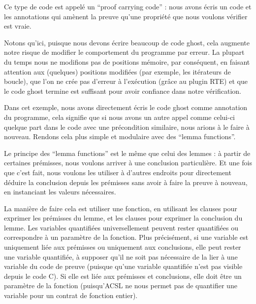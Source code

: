 



Ce type de code est appelé un ``proof carrying code'' : nous avons écris un code
et les annotations qui amènent la preuve qu'une propriété que nous voulons vérifier
est vraie.


Notons qu'ici, puisque nous devons écrire beaucoup de code ghost, cela augmente
notre risque de modifier le comportement du programme par erreur. La plupart du
temps nous ne modifions pas de positions mémoire, par conséquent, en faisant
attention aux (quelques) positions modifiées (par exemple, les itérateurs de
boucle), que l'on ne crée pas d'erreur à l'exécution (grâce au plugin RTE) et
que le code ghost termine est suffisant pour avoir confiance dans notre
vérification.


Dans cet exemple, nous avons directement écris le code ghost comme annotation du
programme, cela signifie que si nous avons un autre appel comme celui-ci quelque
part dans le code avec une précondition similaire, nous arions à le faire à
nouveau. Rendons cela plus simple et modulaire avec des ``lemma functions''.





Le principe des ``lemma functions'' est le même que celui des lemmes : à
partir de certaines prémisses, nous voulons arriver à une conclusion particulière.
Et une fois que c'est fait, nous voulons les utiliser à d'autres endroits pour 
directement déduire la conclusion depuis les prémisses sans avoir à faire la
preuve à nouveau, en instanciant les valeurs nécessaires.


La manière de faire cela est utiliser une fonction, en utilisant les clauses
 pour exprimer les prémisses du lemme, et les clauses
 pour exprimer la conclusion du lemme. Les variables
quantifiées universellement peuvent rester quantifiées ou correspondre à un
paramètre de la fonction. Plus précisément, si une variable est uniquement liée
aux prémisses ou uniquement aux conclusions, elle peut rester une variable
quantifiée, à supposer qu'il ne soit pas nécessaire de la lier à une variable
du code de preuve (puisque qu'une variable quantifiée n'est pas visible depuis
le code C). Si elle est liée aux prémisses et conclusions, elle doit être un
paramètre de la fonction (puisqu'ACSL ne nous permet pas de quantifier une
variable pour un contrat de fonction entier).


